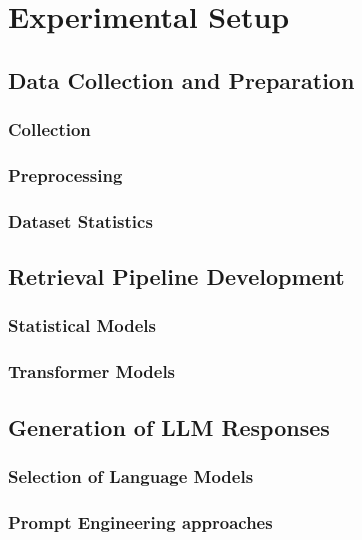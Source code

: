 \chapter{Experimental Setup}


\section{Data Collection and Preparation}

\subsection{Collection}

\subsection{Preprocessing}

\subsection{Dataset Statistics}


\section{Retrieval Pipeline Development}

\subsection{Statistical Models}

\subsection{Transformer Models}

\section{Generation of LLM Responses}


\subsection{Selection of Language Models}

\subsection{Prompt Engineering approaches}
